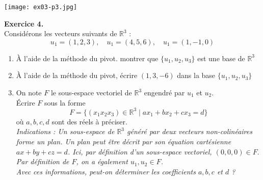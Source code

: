 \documentclass[a4paper, 10pt]{report}
\begin{document}
	\texttt{[image: ex03-p3.jpg]}
	
	\newpage
	
	\noindent
	\textbf{Exercice 4.}\\
	Considérons les vecteurs suivants de $\mathbb{R}^3$ :
	\[
		u_1 = (1, 2, 3), \quad u_1 = (4, 5, 6), \quad u_1 = (1, -1, 0)
	\]
	\begin{enumerate}[label=(\roman*)]
		\item À l'aide de la méthode du pivot. montrer que
		$\{u_1, u_2, u_3\}$ est une base de $\mathbb{R}^3$
		\item À l'aide de la méthode du pivot, écrire $(1, 3, -6)$
		dans la base $\{u_1, u_2, u_3\}$
		\item On note $F$ le sous-espace vectoriel de $\mathbb{R}^3$
		engendré par $u_1$ et $u_2$.\\
		Écrire $F$ sous la forme
		\[
		F = \{(x_1 x_2 x_3) \in \mathbb{R}^3 \mid ax_1 + bx_2 + cx_3 = d\}
		\]
		où $a, b, c, d$ sont des réels à préciser.\\
		\textit{Indications : Un sous-espace de $\mathbb{R}^3$ généré par
			deux vecteurs non-colinéaires forme un plan. Un plan peut être
			décrit par son équation cartésienne $ax + by + cz = d$. Ici,
			par définition d’un sous-espace	vectoriel, $(0, 0, 0) \in F.$
			Par définition de $F$, on a également $u_1, u_2 \in F$.\\
			Avec ces informations, peut-on déterminer les coefficients
			$a, b, c$ et $d$ ?}
	\end{enumerate}
	
\end{document}
